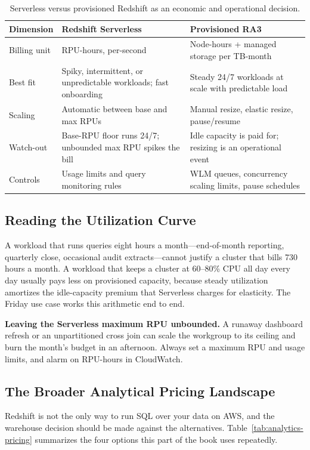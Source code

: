 \begin{table}[H]
\centering
\small
\begin{tabular}{@{}p{3.2cm}p{4.4cm}p{5.6cm}@{}}
\toprule
\textbf{Dimension} & \textbf{Redshift Serverless} & \textbf{Provisioned RA3} \\
\midrule
Billing unit & RPU-hours, per-second & Node-hours + managed storage per TB-month \\
Best fit & Spiky, intermittent, or unpredictable workloads; fast onboarding & Steady 24/7 workloads at scale with predictable load \\
Scaling & Automatic between base and max RPUs & Manual resize, elastic resize, pause/resume \\
Watch-out & Base-RPU floor runs 24/7; unbounded max RPU spikes the bill & Idle capacity is paid for; resizing is an operational event \\
Controls & Usage limits and query monitoring rules & WLM queues, concurrency scaling limits, pause schedules \\
\bottomrule
\end{tabular}
\caption{Serverless versus provisioned Redshift as an economic and operational decision.}
\label{tab:redshift-serverless-vs-ra3}
\end{table}

\subsection{Reading the Utilization Curve}
A workload that runs queries eight hours a month---end-of-month reporting, quarterly close, occasional audit extracts---cannot justify a cluster that bills 730 hours a month. A workload that keeps a cluster at 60--80\% CPU all day every day usually pays less on provisioned capacity, because steady utilization amortizes the idle-capacity premium that Serverless charges for elasticity. The Friday use case works this arithmetic end to end.

\begin{pitfall}
\textbf{Leaving the Serverless maximum RPU unbounded.} A runaway dashboard refresh or an unpartitioned cross join can scale the workgroup to its ceiling and burn the month's budget in an afternoon. Always set a maximum RPU and usage limits, and alarm on RPU-hours in CloudWatch.
\end{pitfall}

\subsection{The Broader Analytical Pricing Landscape}
Redshift is not the only way to run SQL over your data on AWS, and the warehouse decision should be made against the alternatives. Table~\ref{tab:analytics-pricing} summarizes the four options this part of the book uses repeatedly.

